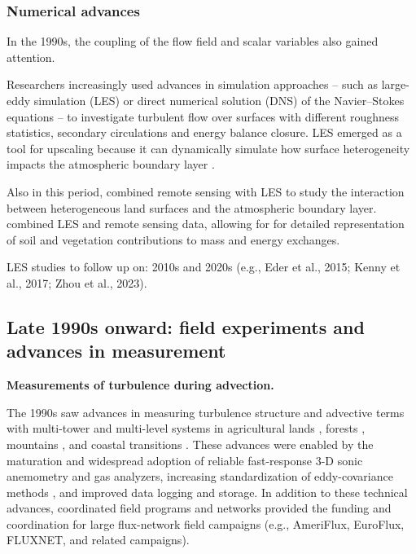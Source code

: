 \documentclass{article}
\begin{document}
    \subsubsection*{Numerical advances}

     In the 1990s, the coupling of the flow field and scalar variables also gained attention.

    Researchers  increasingly used advances in simulation approaches -- such as large-eddy simulation (LES) or direct numerical solution (DNS) of the Navier–Stokes equations -- to investigate turbulent flow over surfaces with different roughness statistics, secondary circulations and energy balance closure.
    LES  emerged as a  tool for upscaling because it can dynamically simulate how surface heterogeneity impacts the atmospheric boundary layer \cite{albertson2001large}.

    Also in this period, \cite{albertson2001large} combined  remote sensing  with LES to study the interaction between heterogeneous land surfaces and the atmospheric boundary layer. 
    \citet{kustas2003effects} combined LES and remote sensing data, allowing for for detailed representation of soil and vegetation contributions to mass and energy exchanges.

     LES studies to follow up on: 2010s and 2020s (e.g., Eder et al., 2015; Kenny et al., 2017; Zhou et al., 2023).

    \subsection{Late 1990s onward: field experiments and advances in  measurement}

    \textbf{Measurements of turbulence during advection. }

    The 1990s saw advances in measuring turbulence structure and advective terms with multi-tower and multi-level systems 
    in agricultural lands \cite{baldocchi_intra-field_1995} , 
    forests \cite{staebler2004observing}, 
    mountains \cite{hammerle2007eddy, yi2008contribution}, and 
    coastal transitions \citep{allen2007satellite, rey-sanchez_evaporation_2017}.
    These advances were enabled by the 
    maturation and widespread adoption of reliable fast-response 3-D sonic anemometry and gas analyzers,
    increasing standardization of eddy-covariance methods \cite{fisher_ecostress_2020},
    and improved data logging and storage.
    In addition to these technical advances, coordinated field programs and networks provided the funding and coordination for  large flux-network field campaigns (e.g., AmeriFlux, EuroFlux, FLUXNET, and related campaigns).
\end{document}
